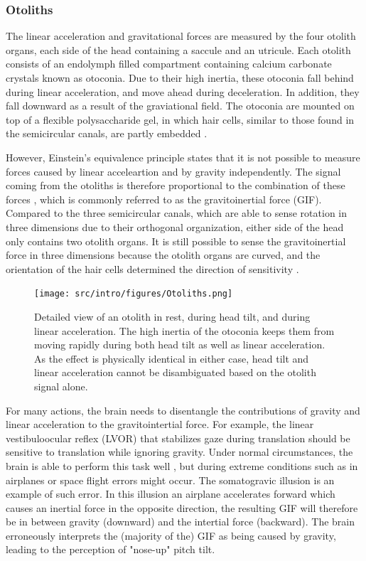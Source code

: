 \subsubsection{Otoliths}
The linear acceleration and gravitational forces are measured by the four otolith organs, each side of the head containing a saccule and an utricule. Each otolith consists of an endolymph filled compartment containing calcium carbonate crystals known as otoconia. Due to their high inertia, these otoconia fall behind during linear acceleration, and move ahead during deceleration. In addition, they fall downward as a result of the graviational field. The otoconia are mounted on top of a flexible polysaccharide gel, in which hair cells, similar to those found in the semicircular canals, are partly embedded \cite{goldberg2012}.  

However, Einstein's equivalence principle states that  it is not possible to measure forces caused by linear acceleartion and by gravity independently. The signal coming from the otoliths is therefore proportional to the combination of these forces \cite{fernandez1976b}, which is commonly referred to as the gravitoinertial force (GIF). Compared to the three semicircular canals, which are able to sense rotation in three dimensions due to their orthogonal organization, either side of the head only contains two otolith organs. It is still possible to sense the gravitoinertial force in three dimensions because the otolith organs are curved, and the orientation of the hair cells determined the direction of sensitivity \cite{goldberg2012}.

\begin{figure}
    \texttt{[image: src/intro/figures/Otoliths.png]}
    \caption{Detailed view of an otolith  in rest,  during head tilt, and  during linear acceleration. The high inertia of the otoconia keeps them from moving rapidly during both head tilt as well as linear acceleration. As the effect is physically identical in either case, head tilt and linear acceleration cannot be disambiguated based on the otolith signal alone.}
    \label{intro:fig7}
\end{figure}

For many actions, the brain needs to disentangle the contributions of gravity and linear acceleration to the gravitointertial force. For example, the linear vestibuloocular reflex (LVOR) that stabilizes gaze during translation should be sensitive to translation while ignoring gravity. Under normal circumstances, the brain is able to perform this task well \cite{merfeld1995}, but during extreme conditions such as in airplanes or space flight errors might occur. The somatogravic illusion \cite{glasauer1995} is an example of such error. In this illusion an airplane accelerates forward which causes an inertial force in the opposite direction, the resulting GIF will therefore be in between gravity (downward) and the intertial force (backward). The brain erroneously interprets the (majority of the) GIF as being caused by gravity, leading to the perception of "nose-up" pitch tilt.


